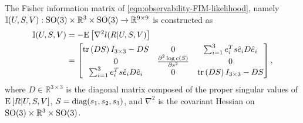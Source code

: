 \begin{lemma} \label{lemma:observability-FIM}
	The Fisher information matrix of \eqref{eqn:observability-FIM-likelihood}, namely $\mathbb{I}(U,S,V): \mathrm{SO}(3) \times \mathbb{R}^3 \times \mathrm{SO}(3) \rightarrow \mathbb{R}^{9\times 9}$ is constructed as 
	\begin{align} \label{eqn:observability-FIM}
		\mathbb{I} (U,S,V) &= -\mathrm{E}\left[  \nabla^2 l (R|U,S,V)  \right]\nonumber \\
		&=\begin{bmatrix}
			\mathrm{tr}\left( DS \right)I_{3\times 3}- DS  & 0 & \sum_{i=1}^3 e_i^T s \hat e_i D\hat e_i \\
			0 & \frac{\partial^2 \log c(S)}{\partial s^2} & 0 \\
			\sum_{i=1}^3 e_i^T s \hat e_i D\hat e_i& 0 & \mathrm{tr}\left( DS \right)I_{3\times 3} -DS
		\end{bmatrix},
	\end{align}
	where $D\in\mathbb{R}^{3\times 3}$ is the diagonal matrix composed of the proper singular values of $\mathrm{E}\left[ R|U,S,V \right]$, $S = \mathrm{diag}(s_1, s_2, s_3)$, and $\nabla^2$ is the covariant Hessian on $\mathrm{SO}(3)\times\mathbb{R}^3\times\mathrm{SO}(3)$.
\end{lemma}
